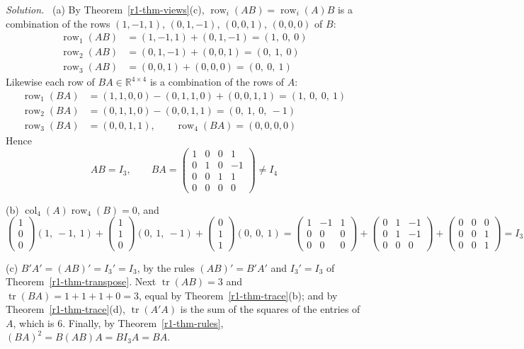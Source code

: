 \documentclass[12pt]{article}
\newcommand{\R}{\mathbb R}
\DeclareMathOperator{\tr}{tr}
\DeclareMathOperator{\row}{row}
\DeclareMathOperator{\col}{col}
\theoremstyle{definition}
\newenvironment{solution}{\par\noindent\textit{Solution.}\ }{\par\smallskip}
\begin{document}
\begin{solution}
(a) By Theorem~\ref{r1-thm-views}(c), \(\row_i(AB)=\row_i(A)B\) is a combination of the rows
\((1,-1,1)\), \((0,1,-1)\), \((0,0,1)\), \((0,0,0)\) of \(B\):
\[
\begin{aligned}
\row_1(AB)&=(1,-1,1)+(0,1,-1)=(1,\ 0,\ 0)\\
\row_2(AB)&=(0,1,-1)+(0,0,1)=(0,\ 1,\ 0)\\
\row_3(AB)&=(0,0,1)+(0,0,0)=(0,\ 0,\ 1)
\end{aligned}
\]
Likewise each row of \(BA\in\R^{4\times4}\) is a combination of the rows of \(A\):
\[
\begin{aligned}
\row_1(BA)&=(1,1,0,0)-(0,1,1,0)+(0,0,1,1)=(1,\ 0,\ 0,\ 1)\\
\row_2(BA)&=(0,1,1,0)-(0,0,1,1)=(0,\ 1,\ 0,\ -1)\\
\row_3(BA)&=(0,0,1,1),\qquad \row_4(BA)=(0,0,0,0)
\end{aligned}
\]
Hence
\[
AB=I_3,\qquad
BA=\begin{pmatrix}1&0&0&1\\0&1&0&-1\\0&0&1&1\\0&0&0&0\end{pmatrix}\ne I_4
\]

(b) \(\col_4(A)\row_4(B)=0\), and
\[
\begin{pmatrix}1\\0\\0\end{pmatrix}(1,\ -1,\ 1)+\begin{pmatrix}1\\1\\0\end{pmatrix}(0,\ 1,\ -1)
+\begin{pmatrix}0\\1\\1\end{pmatrix}(0,\ 0,\ 1)
=\begin{pmatrix}1&-1&1\\0&0&0\\0&0&0\end{pmatrix}+\begin{pmatrix}0&1&-1\\0&1&-1\\0&0&0\end{pmatrix}
+\begin{pmatrix}0&0&0\\0&0&1\\0&0&1\end{pmatrix}=I_3
\]

(c) \(B'A'=(AB)'=I_3'=I_3\), by the rules \((AB)'=B'A'\) and \(I_3'=I_3\) of Theorem~\ref{r1-thm-transpose}.
Next \(\tr(AB)=3\) and
\(\tr(BA)=1+1+1+0=3\), equal by Theorem~\ref{r1-thm-trace}(b); and by
Theorem~\ref{r1-thm-trace}(d), \(\tr(A'A)\) is the sum of the squares of the entries of \(A\),
which is \(6\). Finally, by Theorem~\ref{r1-thm-rules},
\((BA)^2=B(AB)A=BI_3A=BA\).
\end{solution}
\end{document}

